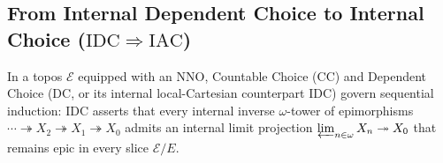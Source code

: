 \subsection{From Internal Dependent Choice to Internal Choice ($\mathrm{IDC} \Rightarrow \mathrm{IAC}$)}

In a topos $\mathcal{E}$ equipped with an $\mathrm{NNO}$, Countable Choice ($\mathrm{CC}$) and Dependent Choice ($\mathrm{DC}$, or its internal local-Cartesian counterpart $\mathrm{IDC}$) govern sequential induction: $\mathrm{IDC}$ asserts that every internal inverse $\omega$-tower of epimorphisms $\cdots \twoheadrightarrow X_2 \twoheadrightarrow X_1 \twoheadrightarrow X_0$ admits an internal limit projection $\varprojlim_{n \in \omega} X_n \twoheadrightarrow X_0$ that remains epic in every slice $\mathcal{E}/E$.

